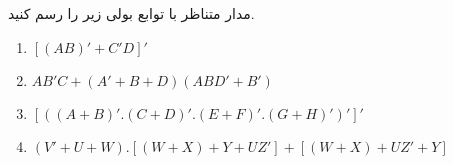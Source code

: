 مدار متناظر با توابع بولی زیر را رسم کنید.

\begin{latin}
	\begin{enumerate}
		\item 
		$[(AB)' + C'D]'$
		
		\item 
		$AB'C + (A' + B + D)(ABD' + B')$
		
		\item 
		$[ ((A + B)' . (C + D)' . (E + F)' . (G + H)')']'$
		
		\item 
		$(V' + U + W).[(W + X) + Y + UZ'] + [ (W + X) + UZ' + Y ]$
	\end{enumerate}
\end{latin}







%
%		
%		
%		
